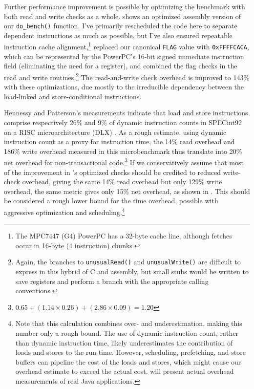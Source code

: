 Further performance improvement is possible by optimizing the
benchmark with both read and write checks as a whole. 
shows an
optimized assembly version of our \texttt{do\_bench()} function.  I've
primarily rescheduled the code here to separate dependent instructions
as much as possible, but I've also ensured repeatable instruction
cache alignment,\footnote{The MPC7447 (G4) PowerPC has a 32-byte cache
  line, although fetches occur in 16-byte (4 instruction) chunks.}
replaced our canonical \texttt{FLAG} value with
\texttt{0xFFFFCACA}, which can be represented by the PowerPC's 16-bit
signed immediate instruction field (eliminating the need for a
register), and combined the flag checks in
the read and write routines.\footnote{Again, the branches to
\texttt{unusualRead()} and 
\texttt{unusualWrite()} are difficult to express in this hybrid of C
and assembly, but small stubs would be written to save registers and
perform a branch with the appropriate calling conventions.}
The read-and-write check overhead is improved to 143\% with these
optimizations, due mostly to the irreducible dependency between the
load-linked and store-conditional instructions.


Hennessy and Patterson's measurements indicate that load and store
instructions comprise respectively 26\% and 9\% of dynamic instruction
counts in SPECint92 on a RISC microarchitecture (DLX)
\cite[p. 105]{HennessyPa96}.
As a rough estimate, using dynamic instruction count as a proxy for
instruction time,
the 14\% read overhead and 186\% write overhead measured
in this microbenchmark thus translate into 20\% net overhead for
non-transactional code.\footnote{$0.65 + (1.14 \times 0.26) + (2.86
  \times 0.09) = 1.20$} If we conservatively assume that most of the
improvement in 's optimized checks should be credited
to reduced write-check overhead, giving the same 14\% read overhead
but only 129\% write overhead, the same metric gives only 15\% net
overhead, as shown in .  This should be
considered a rough lower bound for the time overhead, possible with
aggressive optimization and scheduling.\footnote{Note that this
  calculation combines over- and underestimation, making this number
  only a rough bound.  The use of dynamic instruction count, rather
  than dynamic instruction time, likely underestimates the
  contribution of loads and stores to the run time.  However,
  scheduling, prefetching, and store buffers can pipeline the cost of
  the loads and stores, which might cause our overhead estimate to
  exceed the actual cost.   will present actual
  overhead measurements of real Java applications.}


